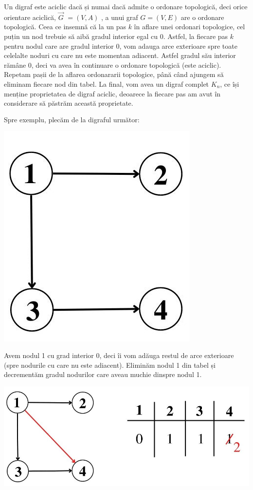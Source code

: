 \documentclass[12pt]{article}
\begin{document}
\begin{itemize}
Un digraf este aciclic dacă și numai dacă admite o ordonare topologică, deci orice orientare aciclică, $\vec{G}$ $=(V,A)$ , a unui graf $G=(V,E)$ are o ordonare topologică.
Ceea ce insemnă că la un pas $k$ în aflare unei ordonari topologice, cel puțin un nod trebuie să aibă gradul interior egal cu $0$.
Astfel, la fiecare pas $k$ pentru nodul care are gradul interior 0, vom adauga arce exterioare spre toate celelalte noduri cu care nu este momentan adiacent. Astfel gradul său interior rămâne 0, deci va avea în continuare o ordonare topologică (este aciclic). \\
    
Repetam pașii de la aflarea ordonararii topologice, până când ajungem să eliminam fiecare nod din tabel. La final, vom avea un digraf complet $K_n$, ce își menține proprietatea de digraf aciclic, deoarece la fiecare pas am avut în considerare să păstrăm această proprietate.

Spre exemplu, plecăm de la digraful următor:

\includegraphics[scale=0.4]{Tema_2c_1.jpg}

Avem nodul 1 cu grad interior 0, deci îi vom adăuga restul de arce exterioare (spre nodurile cu care nu este adiacent).
Eliminăm nodul 1 din tabel și decrementăm gradul nodurilor care aveau muchie dinspre nodul 1.

\includegraphics[scale=0.4]{Tema_2c_2.jpg}


\end{itemize}
\end{document}
